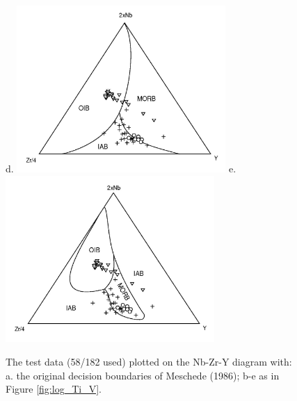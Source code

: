 \begin{figure}[htbp]
d.  \includegraphics[width=300]{figures/test_Nb_Zr_Y_lin.jpg}
e.  \includegraphics[width=300]{figures/test_Nb_Zr_Y_q.jpg}
  \caption[The test data plotted on the Nb-Zr-Y diagram]
{The test data  (58/182 used) plotted on the  Nb-Zr-Y diagram with: a.
the original decision boundaries of  Meschede (1986); b-e as in Figure
\ref{fig:log_Ti_V}.}
  \label{fig:log_Nb_Zr_Y}
\end{figure}

